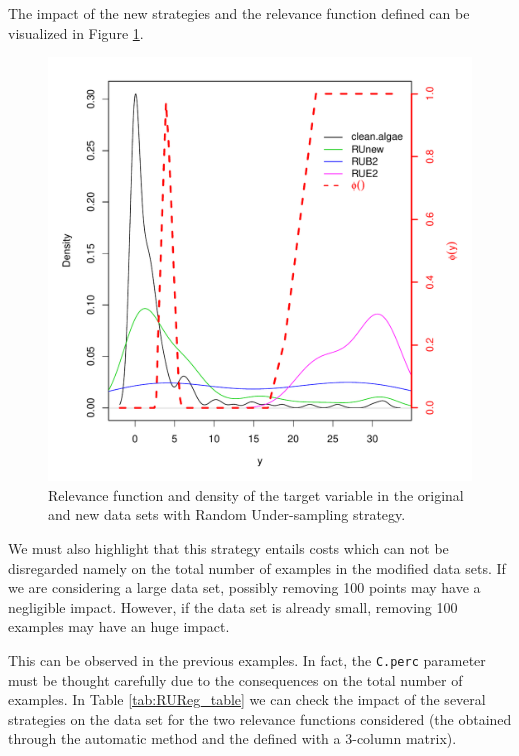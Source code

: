 \documentclass[10pt,a4paper]{article}\usepackage[]{graphicx}\usepackage[]{color}
\makeatletter
\def\maxwidth{ %
  \ifdim\Gin@nat@width>\linewidth
    \linewidth
  \else
    \Gin@nat@width
  \fi
}
\newenvironment{knitrout}{}{} %
\makeatother
\begin{document}
The impact of the new strategies and the relevance function defined can be visualized in Figure \ref{fig:RU_ex2}.
\begin{knitrout}\footnotesize
{}\color{fgcolor}\begin{figure}

{\centering \includegraphics[width=\maxwidth]{figures/UBL-RU_ex2-1} 

}

\caption[Relevance function and density of the target variable in the original and new data sets with Random Under-sampling strategy]{Relevance function and density of the target variable in the original and new data sets with Random Under-sampling strategy.}\label{fig:RU_ex2}
\end{figure}


\end{knitrout}

We must also highlight that this strategy entails costs which can not be disregarded namely on the total number of examples in the modified data sets. If we are considering a large data set, possibly removing 100 points may have a negligible impact. However, if the data set is already small, removing 100 examples may have an huge impact. 

This can be observed in the previous examples. In fact, the \texttt{C.perc} parameter must be thought carefully due to the consequences on the total number of examples. In Table \ref{tab:RUReg_table} we can check the impact of the several strategies on the data set for the two relevance functions considered (the obtained through the automatic method and the defined with a 3-column matrix).
\end{document}

